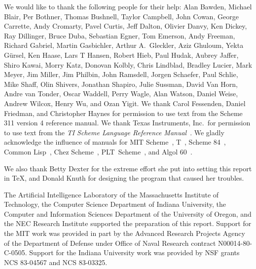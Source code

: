 We would like to thank the following people for their help: Alan Bawden, Michael
Blair, Per Bothner, Thomas Bushnell, Taylor Campbell, John Cowan, George Carrette, Andy Cromarty, Pavel Curtis, Jeff Dalton, Olivier Danvy,
Ken Dickey, Ray Dillinger, Bruce Duba, 
Sebastian Egner, Tom Emerson,
Andy Freeman, Richard Gabriel, Martin Gasbichler, Arthur A.\ Gleckler,
Aziz Ghuloum, Yekta G\"ursel, Ken Haase, Lars T Hansen,
Robert Hieb, Paul Hudak, Aubrey Jaffer, Shiro Kawai, Morry Katz, Donovan Kolbly, Chris Lindblad, Bradley
Lucier, Mark Meyer, Jim Miller, Jim Philbin,
John Ramsdell, Jorgen Schaefer, Paul Schlie, Mike Shaff, Olin Shivers, Jonathan Shapiro, Julie Sussman,
David Van Horn, Andre van Tonder, Oscar Waddell,
Perry Wagle, Alan Watson, Daniel Weise, Andrew Wilcox, Henry Wu,
and Ozan Yigit.
We thank Carol Fessenden, Daniel
Friedman, and Christopher Haynes for permission to use text from the Scheme 311
version 4 reference manual.  We thank Texas Instruments, Inc.~for permission to
use text from the {\em TI Scheme Language Reference Manual}~\cite{TImanual85}.
We gladly acknowledge the influence of manuals for MIT Scheme~\cite{MITScheme},
T~\cite{Rees84}, Scheme 84~\cite{Scheme84}, Common Lisp~\cite{CLtL},
Chez Scheme~\cite{csug7}, PLT~Scheme~\cite{mzscheme301},
and Algol 60~\cite{Naur63}.

\vest We also thank Betty Dexter for the extreme effort she put into
setting this report in \TeX, and Donald Knuth for designing the program
that caused her troubles.

\vest The Artificial Intelligence Laboratory of the
Massachusetts Institute of Technology, the Computer Science
Department of Indiana University, the Computer and Information
Sciences Department of the University of Oregon, and the NEC Research
Institute supported the preparation of this report.  Support for the MIT
work was provided in part by
the Advanced Research Projects Agency of the Department of Defense under Office
of Naval Research contract N00014-80-C-0505.  Support for the Indiana
University work was provided by NSF grants NCS 83-04567 and NCS
83-03325.


